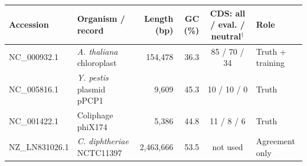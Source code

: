 \begin{tabular}{llrrcl}
\toprule
Accession & Organism / record & Length (bp) & GC (\%) & CDS: all / eval. / neutral$^\dagger$ & Role \\
\midrule
NC\_000932.1 & \textit{A. thaliana} chloroplast & 154,478 & 36.3 & 85 / 70 / 34 & Truth + training \\
NC\_005816.1 & \textit{Y. pestis} plasmid pPCP1 & 9,609 & 45.3 & 10 / 10 / 0 & Truth \\
NC\_001422.1 & Coliphage phiX174 & 5,386 & 44.8 & 11 / 8 / 6 & Truth \\
NZ\_LN831026.1 & \textit{C. diphtheriae} NCTC11397 & 2,463,666 & 53.5 & not used & Agreement only \\
\bottomrule
\end{tabular}
